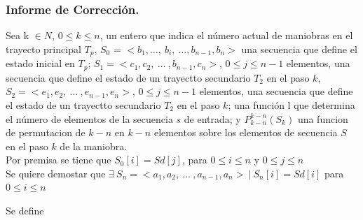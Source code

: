 \documentclass[12pt, a4paper]{article}
\begin{document}
\subsubsection{Informe de Corrección.}
Sea k $\in N$, $ 0 \leq k \leq n$, un entero que indica el número actual de maniobras en el trayecto principal $T_p$,
$S_0$ = $<b_1, \ldots,~b_i,~\ldots, b_{n-1}, b_n>$ una secuencia que define el estado inicial en $T_p$;
$S_1 = < c_1, c_2,~\ldots~, b_{n-1}, c_n >$, $ 0 \leq j \leq n - 1$ elementos, una secuencia que define el estado de un trayectto secundario $T_2$ en el paso $k$,
$S_2 =  < e_1, e_2,~\ldots~, e_{n-1}, e_n >$, $ 0 \leq j \leq n - 1$ elementos, una secuencia que define el estado de un trayectto secundario $T_2$ en el paso $k$;
una función l que determina el número de elementos de la secuencia $s$ de entrada;
y $P_{k-n}^{k-n}(S_k)$ una funcion de permutacion de $k-n$ en $k-n$ elementos sobre los elementos de secuencia
$S$ en el paso $k$ de la maniobra. \\
Por premisa se tiene que $S_0[i] = Sd[j]$,  para $0 \leq i \leq n$ y $0 \leq j \leq n$ \\
Se quiere demostar que $\exists~ S_n = < a_1, a_2, ~\ldots~, a_{n-1}, a_n >~|~S_n[i] = Sd[i]$ para $0 \leq i \leq n$

Se define  \\
\end{document}
